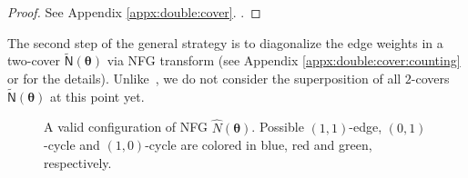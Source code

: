 \documentclass[conference]{IEEEtran}
\theoremstyle{plain}
\theoremstyle{definition}
\newcommand{\sfn}{\mathsf{N}}
\newcommand{\hatfr}[1]{\widehat{f}^{\mathrm{R}}_{ #1 }}
\newcommand{\hatfl}[1]{\widehat{f}^{\mathrm{L}}_{ #1 }}
\newcommand{\btheta}{\boldsymbol{\theta}}
\begin{document}

\begin{proof}
 See \iflongversion Appendix \ref{appx:double:cover}.  \else \cite{zhou2026}.
 \fi
\end{proof}


The second step of the general strategy is to diagonalize the edge weights in a
two-cover $\widetilde{\sfn}(\btheta)$ via NFG transform (see \iflongversion
Appendix \ref{appx:double:cover:counting} \else \cite{zhou2026} \fi or
\cite{vontobelAnalysisDoubleCovers2016,ngDoublecoverbasedAnalysisBethe2022} for
the details). Unlike~\cite[Prop.~1]{ngDoublecoverbasedAnalysisBethe2022}, we do
not consider the superposition of all $2$-covers $\widetilde{\sfn}(\btheta)$ at
this point yet.


\begin{figure}[t]
 \centering
\begin{minipage}{.23\textwidth}
\centering
{}
\end{minipage}%
 \caption{A valid configuration of NFG $\widehat{N}(\btheta)$. Possible $(1,1)$-edge,
  $(0,1)$-cycle and $(1,0)$-cycle are colored in blue, red and green,
  respectively.
 } \label{fig:doublecover:NFG:cong}
\end{figure}
\end{document}
